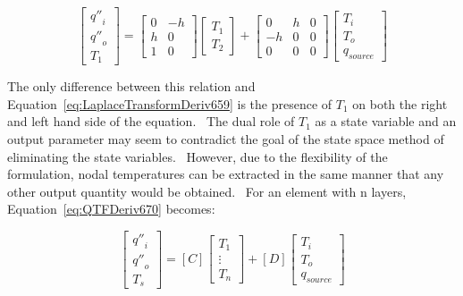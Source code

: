 \begin{equation}
\left[ {\begin{array}{*{20}{c}}{{{q''}_i}}\\ {{{q''}_o}}\\ {{T_1}}\end{array}} \right] = \left[ {\begin{array}{*{20}{c}}0&{ - h}\\h&0\\1&0\end{array}} \right]\left[ {\begin{array}{*{20}{c}}{{T_1}}\\ {{T_2}}\end{array}} \right] + \left[ {\begin{array}{*{20}{c}}0&h&0\\ { - h}&0&0\\0&0&0\end{array}} \right]\left[ {\begin{array}{*{20}{c}}{{T_i}}\\ {{T_o}}\\ {{q_{source}}}\end{array}} \right]
\label{eq:QTFDeriv670}
\end{equation}

The only difference between this relation and Equation~\ref{eq:LaplaceTransformDeriv659} is the presence of \(T_1\) on both the right and left hand side of the equation.~ The dual role of \(T_1\) as a state variable and an output parameter may seem to contradict the goal of the state space method of eliminating the state variables.~ However, due to the flexibility of the formulation, nodal temperatures can be extracted in the same manner that any other output quantity would be obtained.~ For an element with n layers, Equation~\ref{eq:QTFDeriv670} becomes:

\begin{equation}
\left[ {\begin{array}{*{20}{c}}{{{q''}_i}}\\ {{{q''}_o}}\\ {{T_s}}\end{array}} \right] = \left[ C \right]\left[ {\begin{array}{*{20}{c}}{{T_1}}\\ \vdots \\ {{T_n}}\end{array}} \right] + \left[ D \right]\left[ {\begin{array}{*{20}{c}}{{T_i}}\\ {{T_o}}\\ {{q_{source}}}\end{array}} \right]
\label{eq:QTFDeriv671}
\end{equation}

